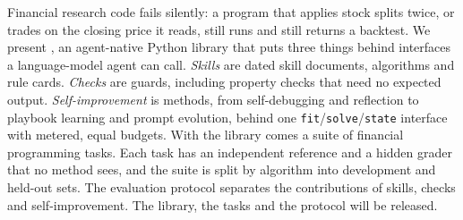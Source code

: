 Financial research code fails silently: a program that applies stock splits twice, or
trades on the closing price it reads, still runs and still returns a backtest. We present
\lib{}, an agent-native Python library that puts three things behind interfaces a language-model
agent can call. \emph{Skills} are \NSkills{} dated skill documents, \NAlgorithms{} algorithms
and \NCards{} rule cards. \emph{Checks} are \NGuards{} guards, including property checks that
need no expected output. \emph{Self-improvement} is \NMethods{} methods, from self-debugging
and reflection to playbook learning and prompt evolution, behind one
\texttt{fit}/\texttt{solve}/\texttt{state} interface with metered, equal budgets. With the
library comes a suite of \NTasks{} financial programming tasks. Each task has an independent
reference and a hidden grader that no method sees, and the suite is split by algorithm into
development and held-out sets. The evaluation protocol separates the contributions of skills,
checks and self-improvement.  The library, the tasks and the protocol will be released.
